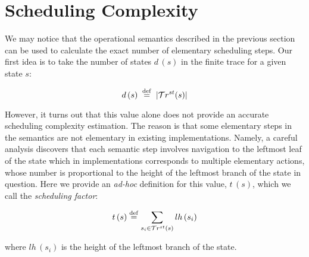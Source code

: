 \section{Scheduling Complexity}
\label{sec:scheduling}


We may notice that the operational semantics described in the previous section can be used to calculate the exact number of elementary scheduling steps.
Our first idea is to take the number of states $d\,(s)$ in the finite trace for a given state $s$:

\[ d\,(s) \; \overset{\mathrm{def}}{=} \; | \mathcal{T}r^{st}(s) |  \]

However, it turns out that this value alone does not provide an accurate scheduling complexity estimation. The reason is that some
elementary steps in the semantics are not elementary in existing implementations. Namely, a careful analysis discovers that
each semantic step involves navigation to the leftmost leaf of the state which in implementations corresponds to multiple elementary actions,
whose number is proportional to the height of the leftmost branch of the state in question. Here we provide an \emph{ad-hoc} definition for this value, $t\,(s)$,
which we call the \emph{scheduling factor}:

\[
t\,(s) \overset{\mathrm{def}}{=} \sum\limits_{s_i \in \mathcal{T}r^{st}(s)} lh\,(s_i) 
\]

where $lh\,(s_i)$ is the height of the leftmost branch of the state. 

\begin{comment}
\[
\begin{array}{rcl}
 lh\,(\taskst{g}{e})  &\eqdef& 1 \\
 lh\,(s_1 \oplus s_2) &\eqdef& lh\,(s_1) + 1 \\
 lh\,(s \otimes g)    &\eqdef& lh\,(s) + 1 \\
\end{array}
\]
\end{comment}


